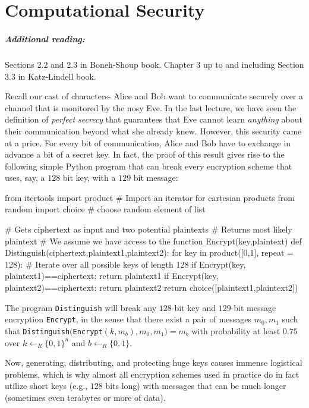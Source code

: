 \chapter{Computational Security}\label{2-Computational-Security}

\paragraph{Additional reading:} Sections 2.2 and 2.3 in Boneh-Shoup
book. Chapter 3 up to and including Section 3.3 in Katz-Lindell book.

Recall our cast of characters- Alice and Bob want to communicate
securely over a channel that is monitored by the nosy Eve. In the last
lecture, we have seen the definition of \emph{perfect secrecy} that
guarantees that Eve cannot learn \emph{anything} about their
communication beyond what she already knew. However, this security came
at a price. For every bit of communication, Alice and Bob have to
exchange in advance a bit of a secret key. In fact, the proof of this
result gives rise to the following simple Python program that can break
every encryption scheme that uses, say, a \(128\) bit key, with a
\(129\) bit message:

\begin{code}
from itertools import product # Import an iterator for cartesian products
from random import choice # choose random element of list

# Gets ciphertext as input and two potential plaintexts
# Returns most likely plaintext
# We assume we have access to the function Encrypt(key,plaintext)
def Distinguish(ciphertext,plaintext1,plaintext2):
    for key in product([0,1], repeat = 128): # Iterate over all possible keys of length 128
        if Encrypt(key, plaintext1)==ciphertext:
            return plaintext1
        if Encrypt(key, plaintext2)==ciphertext:
            return plaintext2
    return choice([plaintext1,plaintext2])
\end{code}

The program \texttt{Distinguish} will break any \(128\)-bit key and
\(129\)-bit message encryption \texttt{Encrypt}, in the sense that there
exist a pair of messages \(m_0,m_1\) such that
\texttt{Distinguish}\((\)\texttt{Encrypt}\((k,m_b),m_0,m_1)=m_b\) with
probability at least \(0.75\) over \(k \leftarrow_R \{0,1\}^n\) and
\(b \leftarrow_R \{0,1\}\).

Now, generating, distributing, and protecting huge keys causes immense
logistical problems, which is why almost all encryption schemes used in
practice do in fact utilize short keys (e.g., \(128\) bits long) with
messages that can be much longer (sometimes even terabytes or more of
data).

